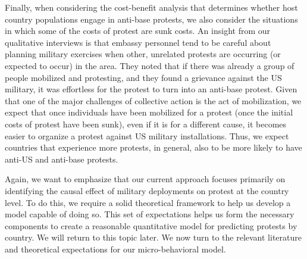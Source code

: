 		
		
		
		
		Finally, when considering the cost-benefit analysis that determines whether host country populations engage in anti-base protests, we also consider the situations in which some of the costs of protest are sunk costs. An insight from our qualitative interviews is that embassy personnel tend to be careful about planning military exercises when other, unrelated protests are occurring (or expected to occur) in the area.  They noted that if there was already a group of people mobilized and protesting, and they found a grievance against the US military, it was effortless for the protest to turn into an anti-base protest.\cite{embone20180712,embthree20180712}  Given that one of the major challenges of collective action is the act of mobilization, we expect that once individuals have been mobilized for a protest (once the initial costs of protest have been sunk), even if it is for a different cause, it becomes easier to organize a protest against US military installations. Thus, we expect countries that experience more protests, in general, also to be more likely to have anti-US and anti-base protests. 
		
		Again, we want to emphasize that our current approach focuses primarily on identifying the causal effect of military deployments on protest at the country level. To do this, we require a solid theoretical framework to help us develop a model capable of doing so. This set of expectations helps us form the necessary components to create a reasonable quantitative model for predicting protests by country. We will return to this topic later. We now turn to the relevant literature and theoretical expectations for our micro-behavioral model. 
		
		
